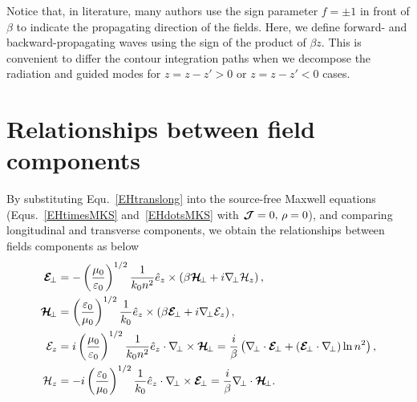 Notice that, in literature, many authors use the sign parameter $ f=\pm 1 $ in front of $ \beta $ to indicate the propagating direction of the fields. Here, we define forward- and backward-propagating waves using the sign of the product of $ \beta z $. This is convenient to differ the contour integration paths when we decompose the radiation and guided modes for $ z=z-z'>0 $ or $ z=z-z'<0 $ cases. 

\section{Relationships between field components}\label{MWE:components}
By substituting Equ.~\ref{EHtranslong} into the source-free Maxwell equations 
(Equs.~\ref{EHtimesMKS} and~\ref{EHdotsMKS} with $ \boldsymbol{\mathcal{J}}=0,\, \rho=0 $), and comparing 
longitudinal and transverse components, we obtain the relationships between fields components as 
below
\begin{subequations}
\label{EHtz0}
\begin{align}
\bmc{E}\!_\perp &= -\left(\frac{\mu_0}{\varepsilon_0} \right)^{1/2} \frac{1}{k_0n^2} \hat{e}_z \times 
\left(\beta \bmc{H}\!_\perp + i\nabla\!_\perp \mathcal{H}_z \right),\\
\bmc{H}\!_\perp &= \left(\frac{\varepsilon_0}{\mu_0} \right)^{1/2} \frac{1}{k_0} \hat{e}_z \times \left(\beta 
\bmc{E}\!_\perp +i\nabla\!_\perp \mathcal{E}_z \right),\\
\mathcal{E}_z &= i\left(\frac{\mu_0}{\varepsilon_0} \right)^{1/2} \frac{1}{k_0n^2} \hat{e}_z \cdot 
\nabla\!_\perp \times \bmc{H}\!_\perp = \frac{i}{\beta} \left( \nabla\!_\perp \cdot \bmc{E}\!_\perp + 
(\bmc{E}\!_\perp \cdot \nabla\!_\perp) \ln n^2 \right),\\
\mathcal{H}_z &= -i \left(\frac{\varepsilon_0}{\mu_0} \right)^{1/2} \frac{1}{k_0}\hat{e}_z \cdot 
\nabla\!_\perp \times \bmc{E}\!_\perp = \frac{i}{\beta} \nabla\!_\perp \cdot \bmc{H}\!_\perp. 
\end{align}
\end{subequations}

